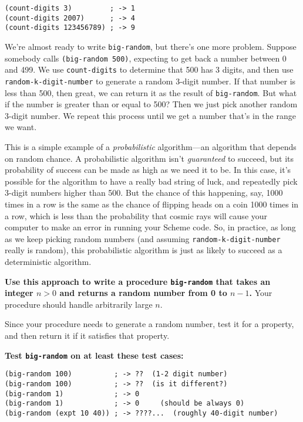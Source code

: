 \begin{verbatim}
(count-digits 3)         ; -> 1
(count-digits 2007)      ; -> 4
(count-digits 123456789) ; -> 9
\end{verbatim}

We're almost ready to write {\tt big-random}, but there's one more
problem.  Suppose somebody calls {\tt (big-random 500)}, expecting to
get back a number between 0 and 499.  We use {\tt count-digits} to
determine that 500 has 3 digits, and then use {\tt
  random-k-digit-number} to generate a random 3-digit number.  If that
number is less than 500, then great, we can return it as the result of
{\tt big-random}.  But what if the number is greater than or equal to
500?  Then we just pick another random 3-digit number.  We repeat this
process until we get a number that's in the range we want.

This is a simple example of a {\it probabilistic} algorithm---an
algorithm that depends on random chance.  A probabilistic algorithm
isn't {\it guaranteed} to succeed, but its probability of success can
be made as high as we need it to be.  In this case, it's possible for
the algorithm to have a really bad string of luck, and repeatedly pick
3-digit numbers higher than 500.  But the chance of this happening,
say, 1000 times in a row is the same as the chance of flipping heads
on a coin 1000 times in a row, which is less than the probability that
cosmic rays will cause your computer to make an error in running your
Scheme code.  So, in practice, as long as we keep picking random
numbers (and assuming {\tt random-k-digit-number} really is random),
this probabilistic algorithm is just as likely to succeed as a
deterministic algorithm.

\newpage

{\bf Use this approach to write a procedure {\tt big-random} that
  takes an integer $n>0$ and returns a random number from 0 to $n-1$.}
Your procedure should handle arbitrarily large $n$.

Since your procedure needs to generate a random number, test it for a
property, and then return it if it satisfies that property.

{\bf Test {\tt big-random} on at least these test cases:}
\begin{verbatim}
(big-random 100)          ; -> ??  (1-2 digit number)
(big-random 100)          ; -> ??  (is it different?)
(big-random 1)            ; -> 0
(big-random 1)            ; -> 0     (should be always 0)
(big-random (expt 10 40)) ; -> ????...  (roughly 40-digit number)
\end{verbatim}

